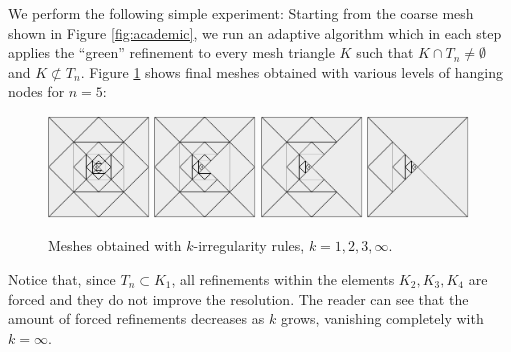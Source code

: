 We perform the following simple experiment: Starting from the
coarse mesh shown in Figure \ref{fig:academic}, we run an adaptive algorithm
which in each step applies the ``green'' refinement to every mesh triangle
$K$ such that $K \cap T_n \not = \emptyset$ and $K \not \subset T_n$.
Figure \ref{fig:academic2} shows final meshes obtained with various
levels of hanging nodes for $n = 5$:

\begin{figure}[h!]
\centering
\includegraphics[width=0.24\textwidth]{img/mesh-1ir}
\includegraphics[width=0.24\textwidth]{img/mesh-2ir}
\includegraphics[width=0.24\textwidth]{img/mesh-3ir}
\includegraphics[width=0.24\textwidth]{img/mesh-free}
\caption{Meshes obtained with $k$-irregularity rules, $k = 1,2,3,\infty$.}
\label{fig:academic2}
\end{figure}

Notice that, since $T_n \subset K_1$, all refinements within the elements
$K_2, K_3, K_4$ are forced and they do not improve the resolution. The reader 
can see that the amount of forced refinements decreases as $k$ grows, 
vanishing completely with $k = \infty$.

